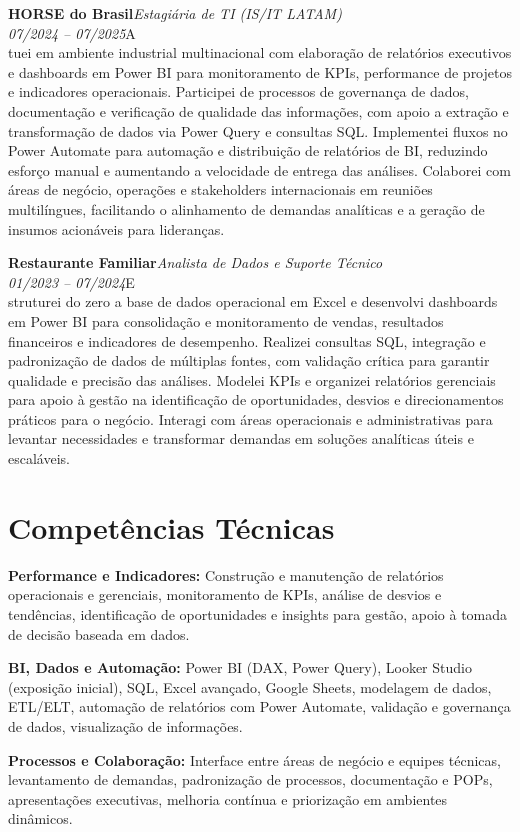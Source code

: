 \documentclass[11pt,a4paper]{article}
\newcommand{\cvrole}[4]{%
  \vspace{4pt}%
  {\bfseries\color{accentcolor}#1}\hfill{\itshape #2}\\[-2pt]%
  {\itshape #3}\hfill #4\\[6pt]%
}
\begin{document}
\cvrole{HORSE do Brasil}{Estagiária de TI (IS/IT LATAM)}{07/2024 -- 07/2025}

Atuei em ambiente industrial multinacional com elaboração de relatórios executivos e dashboards em Power BI para monitoramento de KPIs, performance de projetos e indicadores operacionais. Participei de processos de governança de dados, documentação e verificação de qualidade das informações, com apoio a extração e transformação de dados via Power Query e consultas SQL. Implementei fluxos no Power Automate para automação e distribuição de relatórios de BI, reduzindo esforço manual e aumentando a velocidade de entrega das análises. Colaborei com áreas de negócio, operações e stakeholders internacionais em reuniões multilíngues, facilitando o alinhamento de demandas analíticas e a geração de insumos acionáveis para lideranças.

\cvrole{Restaurante Familiar}{Analista de Dados e Suporte Técnico}{01/2023 -- 07/2024}

Estruturei do zero a base de dados operacional em Excel e desenvolvi dashboards em Power BI para consolidação e monitoramento de vendas, resultados financeiros e indicadores de desempenho. Realizei consultas SQL, integração e padronização de dados de múltiplas fontes, com validação crítica para garantir qualidade e precisão das análises. Modelei KPIs e organizei relatórios gerenciais para apoio à gestão na identificação de oportunidades, desvios e direcionamentos práticos para o negócio. Interagi com áreas operacionais e administrativas para levantar necessidades e transformar demandas em soluções analíticas úteis e escaláveis.

\section{Competências Técnicas}

\textbf{Performance e Indicadores:} Construção e manutenção de relatórios operacionais e gerenciais, monitoramento de KPIs, análise de desvios e tendências, identificação de oportunidades e insights para gestão, apoio à tomada de decisão baseada em dados.

\textbf{BI, Dados e Automação:} Power BI (DAX, Power Query), Looker Studio (exposição inicial), SQL, Excel avançado, Google Sheets, modelagem de dados, ETL/ELT, automação de relatórios com Power Automate, validação e governança de dados, visualização de informações.

\textbf{Processos e Colaboração:} Interface entre áreas de negócio e equipes técnicas, levantamento de demandas, padronização de processos, documentação e POPs, apresentações executivas, melhoria contínua e priorização em ambientes dinâmicos.
\end{document}
